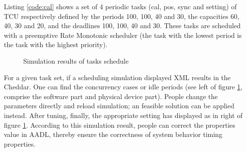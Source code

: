Listing \ref{code:cal} shows a set of 4 periodic tasks (cal, pos, sync and setting) of TCU  respectively defined by the periods 100, 100, 40 and 30, the capacities 60, 40, 30 and 20, and the deadlines 100, 100, 40 and 30. These tasks are scheduled with a preemptive Rate Monotonic scheduler (the task with the lowest period is the task with the highest priority).
\begin{figure}[h]
\centering
{}
\caption{Simulation results of tasks schedule}
\label{fig:sim}
\end{figure}
For a given task set, if a scheduling simulation displayed XML results in the Cheddar. One can find the concurrency cases or idle periods (see left of figure \ref{fig:sim}, comprise the software part and physical device part). People change the parameters directly and reload simulation; an feasible solution can be applied instead. After tuning, finally, the appropriate setting has displayed as in right of figure \ref{fig:sim}. According to this simulation result, people can correct the properties value in AADL, thereby ensure the correctness of system behavior timing properties.  




